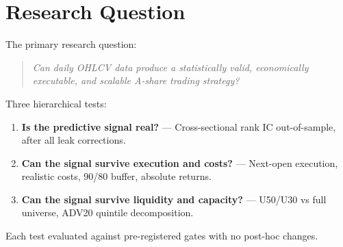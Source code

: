 \section{Research Question}
The primary research question:
\begin{quote}\textit{Can daily OHLCV data produce a statistically valid, economically executable, and scalable A-share trading strategy?}\end{quote}

Three hierarchical tests:
\begin{enumerate}[label=\textbf{T\arabic*:},leftmargin=*]
    \item \textbf{Is the predictive signal real?} --- Cross-sectional rank IC out-of-sample, after all leak corrections.
    \item \textbf{Can the signal survive execution and costs?} --- Next-open execution, realistic costs, 90/80 buffer, absolute returns.
    \item \textbf{Can the signal survive liquidity and capacity?} --- U50/U30 vs full universe, ADV20 quintile decomposition.
\end{enumerate}
Each test evaluated against pre-registered gates with no post-hoc changes.

